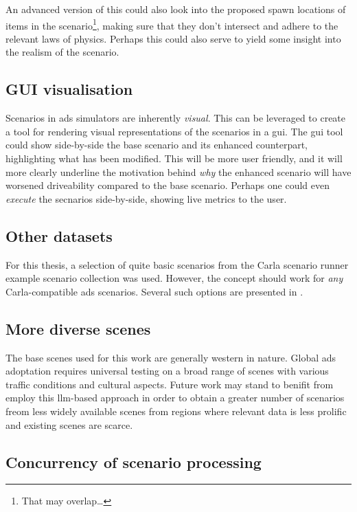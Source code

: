 An advanced version of this could also look into the proposed spawn locations of items in the
scenario\footnote{That may overlap\ldots}, making sure that they don't intersect and adhere to the
relevant laws of physics. Perhaps this could also serve to yield some insight into the realism of
the scenario.

\subsection{GUI visualisation}

Scenarios in \acrshort{ads} simulators are inherently \emph{visual}. This can be leveraged to create
a tool for rendering visual representations of the scenarios in a \acrfull{gui}. The \acrshort{gui}
tool could show side-by-side the base scenario and its enhanced counterpart, highlighting what has
been modified.
This will be more user friendly, and it will more clearly underline the motivation behind \emph{why}
the enhanced scenario will have worsened driveability compared to the base scenario.
Perhaps one could even \emph{execute} the secnarios side-by-side, showing live metrics to the user.

\subsection{Other datasets}

For this thesis, a selection of quite basic scenarios from the Carla scenario runner example
scenario collection was used. However, the concept should work for \emph{any} Carla-compatible
\acrshort{ads} scenarios. Several such options are presented in .

\subsection{More diverse scenes}
The base scenes used for this work are generally western in nature. Global \acrshort{ads} adoptation
requires universal testing on a broad range of scenes with various traffic conditions and cultural
aspects. Future work may stand to benifit from employ this \acrshort{llm}-based approach in order
to obtain a greater number of scenarios freom less widely available scenes from regions where
relevant data is less prolific and existing scenes are scarce.

\subsection{Concurrency of scenario processing}

